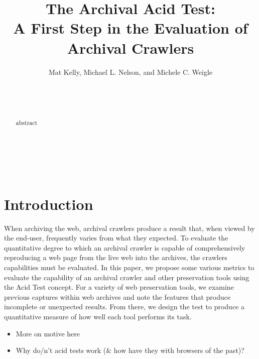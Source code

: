 \documentclass{acm_proc}
\newcommand{\todo}[1]{{\textit{\color{red}#1}}}
\begin{document}
\title{The Archival Acid Test:\\A First Step in the Evaluation of Archival Crawlers\\
\large{\vspace{0.5em}\todo{DRAFT as of \today\ \currenttime}}
\vspace{-2.0em} %
}


\author{
\alignauthor
Mat Kelly, Michael L. Nelson, and Michele C. Weigle\\
	   \\
       \\
       \\
}


\maketitle
\begin{abstract}

abstract

\end{abstract}



\\
\\
\section{Introduction}
When archiving the web, archival crawlers produce a result that, when viewed by the end-user, frequently varies from what they expected. To evaluate the quantitative degree to which an archival crawler is capable of comprehensively reproducing a web page from the live web into the archives, the crawlers capabilities must be evaluated. In this paper, we propose some various metrics to evaluate the capability of an archival crawler and other preservation tools using the Acid Test concept. For a variety of web preservation tools, we examine previous captures within web archives and note the features that produce incomplete or unexpected results. From there, we design the test to produce a quantitative measure of how well each tool performs its task.

\begin{itemize}
\item More on motive here
\item Why do/n't acid tests work (\& how have they with browsers of the past)?
\end{itemize}
\end{document}
